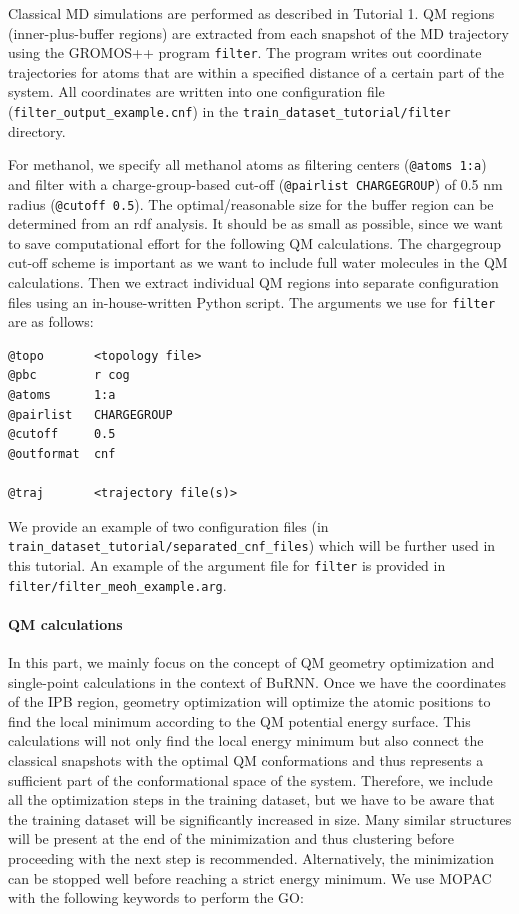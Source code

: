 Classical MD simulations are performed as described in Tutorial 1. QM regions (inner-plus-buffer regions) are extracted from each snapshot of the MD trajectory using the GROMOS++ program \texttt{filter}. The program writes out coordinate trajectories for atoms that are within a specified distance of a certain part of the system. All coordinates are written into one configuration file (\texttt{filter\_output\_example.cnf}) in the \texttt{train\_dataset\_tutorial/filter} directory.

For methanol, we specify all methanol atoms as filtering centers (\texttt{@atoms 1:a}) and filter with a charge-group-based cut-off (\texttt{@pairlist CHARGEGROUP}) of 0.5 nm radius (\texttt{@cutoff 0.5}). The optimal/reasonable size for the buffer region can be determined from an rdf analysis. It should be as small as possible, since we want to save computational effort for the following QM calculations. The chargegroup cut-off scheme is important as we want to include full water molecules in the QM calculations. Then we extract individual QM regions into separate configuration files using an in-house-written Python script. The arguments we use for \texttt{filter} are as follows:

\begin{lstlisting}[breaklines=true, breakatwhitespace=false]
@topo       <topology file>
@pbc        r cog
@atoms      1:a
@pairlist   CHARGEGROUP
@cutoff     0.5
@outformat  cnf

@traj       <trajectory file(s)>
\end{lstlisting}

We provide an example of two configuration files (in \texttt{train\_dataset\_tutorial/separated\_cnf\_files}) which will be further used in this tutorial. An example of the argument file for \texttt{filter} is provided in \texttt{filter/filter\_meoh\_example.arg}.

\paragraph{QM calculations}
In this part, we mainly focus on the concept of QM geometry optimization and single-point calculations in the context of BuRNN. Once we have the coordinates of the IPB region, geometry optimization will optimize the atomic positions to find the local minimum according to the QM potential energy surface. This calculations will not only find the local energy minimum but also connect the classical snapshots with the optimal QM conformations and thus represents a sufficient part of the conformational space of the system. Therefore, we include all the optimization steps in the training dataset, but we have to be aware that the training dataset will be significantly increased in size. Many similar structures will be present at the end of the minimization and thus clustering before proceeding with the next step is recommended. Alternatively, the minimization can be stopped well before reaching a strict energy minimum. We use MOPAC with the following keywords to perform the GO:

